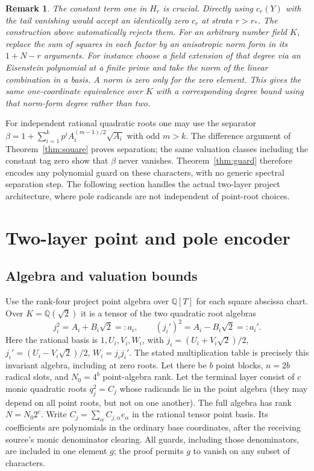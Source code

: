 \documentclass[11pt]{article}
\newtheorem{remark}[theorem]{Remark}
\newcommand{\Q}{\mathbb Q}\newcommand{\Z}{\mathbb Z}\newcommand{\N}{\mathbb N}
\begin{document}
\begin{remark}
The constant term one in $H_r$ is crucial. Directly using $c_r(Y)$
with the tail vanishing would accept an identically zero $c_r$ at
strata $r>r_*$. The construction above automatically rejects them.
For an arbitrary number field $K$, replace the sum of squares in each
factor by an anisotropic norm form in its $1+N-r$ arguments. For instance
choose a field extension of that degree via an Eisenstein polynomial
at a finite prime and take the norm of the linear combination in a
basis. A norm is zero only for the zero element. This gives the same
one-coordinate equivalence over $K$ with a corresponding degree bound
using that norm-form degree rather than two.
\end{remark}

For independent rational quadratic roots one may use the separator
$\beta=1+\sum_{i=1}^k p^i A_i^{(m-1)/2}\sqrt{A_i}$ with odd $m>k$.
The difference argument of Theorem~\ref{thm:square} proves separation;
the same valuation classes including the constant tag zero show that
$\beta$ never vanishes. Theorem~\ref{thm:guard} therefore encodes any
polynomial guard on these characters, with no generic spectral
separation step. The following section handles the actual two-layer
project architecture, where pole radicands are not independent of
point-root choices.

\section{Two-layer point and pole encoder}\label{sec:receive}
\subsection{Algebra and valuation bounds}
Use the rank-four project point algebra over $\Q[T]$ for each square
abscissa chart. Over $K=\Q(\sqrt2)$ it is a tensor of the two quadratic
root algebras
\[
 j_i^2=A_i+B_i\sqrt2=:a_i,\qquad (j_i')^2=A_i-B_i\sqrt2=:a_i'.
\]
Here the rational basis is $1,U_i,V_i,W_i$, with
$j_i=(U_i+V_i\sqrt2)/2$, $j_i'=(U_i-V_i\sqrt2)/2$,
$W_i=j_i j_i'$. The stated multiplication table is precisely this
invariant algebra, including at zero roots. Let there be $b$ point
blocks, $n=2b$ radical slots, and $N_0=4^b$ point-algebra rank. Let the
terminal layer consist of $c$ monic quadratic roots $q_j^2=C_j$ whose
radicands lie in the point algebra (they may depend on all point roots,
but not on one another). The full algebra has rank $N=N_0 2^c$.
Write $C_j=\sum_\alpha C_{j,\alpha}e_\alpha$ in the rational tensor
point basis. Its coefficients are polynomials in the ordinary base
coordinates, after the receiving source's monic denominator clearing.
All guards, including those denominators, are included in one element
$g$; the proof permits $g$ to vanish on any subset of characters.
\end{document}
